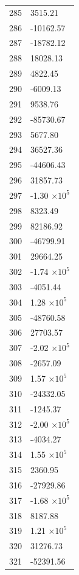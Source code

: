 \documentclass[a4paper,11pt]{article}
\begin{document}
\begin{center}
\begin{longtable}{|R{1.5cm}|R{2.5cm}|}
  285 &      3515.21 \\
  286 &    -10162.57 \\
  287 &    -18782.12 \\
  288 &     18028.13 \\
  289 &      4822.45 \\
  290 &     -6009.13 \\
  291 &      9538.76 \\
  292 &    -85730.67 \\
  293 &      5677.80 \\
  294 &     36527.36 \\
  295 &    -44606.43 \\
  296 &     31857.73 \\
  297 &        -1.30 $\times 10^{           5}$ \\
  298 &      8323.49 \\
  299 &     82186.92 \\
  300 &    -46799.91 \\
  301 &     29664.25 \\
  302 &        -1.74 $\times 10^{           5}$ \\
  303 &     -4051.44 \\
  304 &         1.28 $\times 10^{           5}$ \\
  305 &    -48760.58 \\
  306 &     27703.57 \\
  307 &        -2.02 $\times 10^{           5}$ \\
  308 &     -2657.09 \\
  309 &         1.57 $\times 10^{           5}$ \\
  310 &    -24332.05 \\
  311 &     -1245.37 \\
  312 &        -2.00 $\times 10^{           5}$ \\
  313 &     -4034.27 \\
  314 &         1.55 $\times 10^{           5}$ \\
  315 &      2360.95 \\
  316 &    -27929.86 \\
  317 &        -1.68 $\times 10^{           5}$ \\
  318 &      8187.88 \\
  319 &         1.21 $\times 10^{           5}$ \\
  320 &     31276.73 \\
  321 &    -52391.56 \\

\end{longtable}
\end{center}
\end{document}
